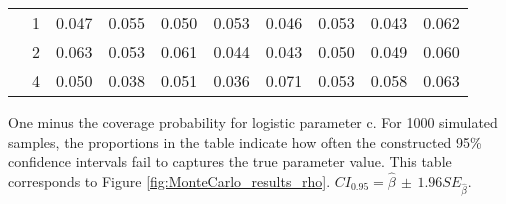 \documentclass[12pt]{article}
\theoremstyle{definition}
\begin{document}
\begin{table}[b!]
\begin{threeparttable}
{\begin{tabular}[r]{l l r r r r r r r r}
          &     1 & 0.047 & 0.055 & 0.050 & 0.053 & 0.046 & 0.053 & 0.043 & 0.062 \\
          &     2 & 0.063 & 0.053 & 0.061 & 0.044 & 0.043 & 0.050 & 0.049 & 0.060 \\
          &     4 & 0.050 & 0.038 & 0.051 & 0.036 & 0.071 & 0.053 & 0.058 & 0.063 \\
  \hline
    \end{tabular}
    }
    \begin{tablenotes}
      \item{\footnotesize One minus the coverage probability for logistic parameter c. For 1000 simulated samples, the proportions in the table indicate how often the constructed 95\% confidence intervals fail to captures the true parameter value. This table corresponds to Figure \ref{fig:MonteCarlo_results_rho}. $CI_{0.95} = \hat\beta \, \pm \, 1.96 SE_{\hat{\beta}}$.}
    \end{tablenotes} \label{tbl:coverage_ratio_rho}
  \end{threeparttable}
\end{table}
\end{document}
